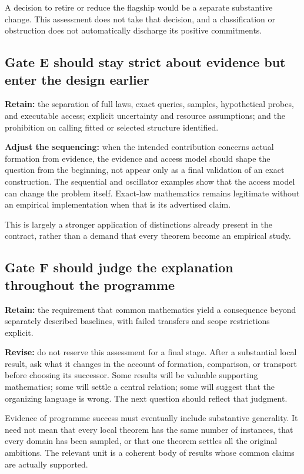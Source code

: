 \documentclass[11pt]{article}
\begin{document}
A decision to retire or reduce the flagship would be a separate substantive change. This assessment does not take that decision, and a classification or obstruction does not automatically discharge its positive commitments.

\subsection{Gate E should stay strict about evidence but enter the design earlier}

\textbf{Retain:} the separation of full laws, exact queries, samples, hypothetical probes, and executable access; explicit uncertainty and resource assumptions; and the prohibition on calling fitted or selected structure identified.

\textbf{Adjust the sequencing:} when the intended contribution concerns actual formation from evidence, the evidence and access model should shape the question from the beginning, not appear only as a final validation of an exact construction. The sequential and oscillator examples show that the access model can change the problem itself. Exact-law mathematics remains legitimate without an empirical implementation when that is its advertised claim.

This is largely a stronger application of distinctions already present in the contract, rather than a demand that every theorem become an empirical study.

\subsection{Gate F should judge the explanation throughout the programme}

\textbf{Retain:} the requirement that common mathematics yield a consequence beyond separately described baselines, with failed transfers and scope restrictions explicit.

\textbf{Revise:} do not reserve this assessment for a final stage. After a substantial local result, ask what it changes in the account of formation, comparison, or transport before choosing its successor. Some results will be valuable supporting mathematics; some will settle a central relation; some will suggest that the organizing language is wrong. The next question should reflect that judgment.

Evidence of programme success must eventually include substantive generality. It need not mean that every local theorem has the same number of instances, that every domain has been sampled, or that one theorem settles all the original ambitions. The relevant unit is a coherent body of results whose common claims are actually supported.
\end{document}
